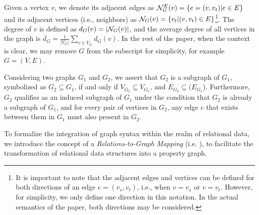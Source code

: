 Given a vertex $v$, we denote its adjacent edges as ${\mathcal{N}}_G^E(v) = \{e = (v, v_t) | e \in E\}$ and its adjacent vertices (i.e., neighbors) as ${\mathcal{N}}_G(v) = \{v_t | (v, v_t) \in E\}$\footnote{It is important to note that the adjacent edges and vertices can be defined for both directions of an edge $e = (v_s, v_t)$, i.e., when $v = v_s$ or $v = v_t$. However, for simplicity, we only define one direction in this notation. In the actual semantics of the paper, both directions may be considered.}. The degree of $v$ is defined as $d_G(v) = |{\mathcal{N}}_G(v)|$, and the average degree of all vertices in the graph is $\overline{d}_G = \frac{1}{|V_G|} \sum_{v \in V_G} d_G(v)$.
In the rest of the paper, when the context is clear, we may remove $G$ from the subscript for simplicity, for example $G=(V, E)$.

Considering two graphs \(G_1\) and \(G_2\), we assert that \(G_2\) is a subgraph of \(G_1\), symbolized as \(G_2 \subseteq G_1\), if and only if \(V_{G_2} \subseteq V_{G_1}\), and \(E_{G_2} \subseteq (E_{G_1}\)). Furthermore, \(G_2\) qualifies as an induced subgraph of \(G_1\) under the condition that \(G_2\) is already a subgraph of \(G_1\), and for every pair of vertices in \(G_2\), any edge \(e\) that exists between them in \(G_1\) must also present in \(G_2\).

To formalize the integration of graph syntax within the realm of relational data, we introduce the concept of a \textit{Relations-to-Graph Mapping} (i.e. \rgmapping), to facilitate the transformation of relational data structures into a property graph.

